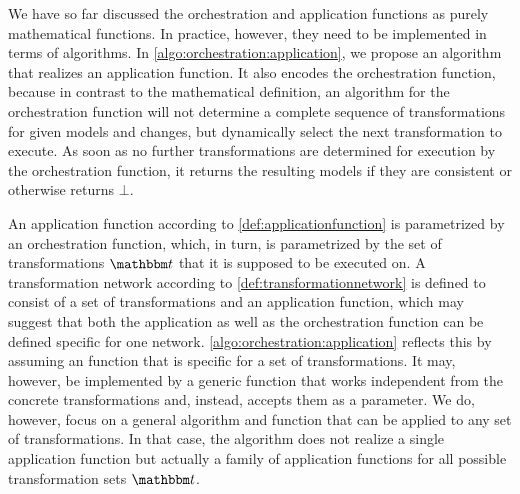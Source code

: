 We have so far discussed the orchestration and application functions as purely mathematical functions.
In practice, however, they need to be implemented in terms of algorithms.
In \autoref{algo:orchestration:application}, we propose an algorithm that realizes an application function.
It also encodes the orchestration function, because in contrast to the mathematical definition, an algorithm for the orchestration function will not determine a complete sequence of transformations for given models and changes, but dynamically select the next transformation to execute.
As soon as no further transformations are determined for execution by the orchestration function, it returns the resulting models if they are consistent or otherwise returns $\bot$.

An application function according to \autoref{def:applicationfunction} is parametrized by an orchestration function, which, in turn, is parametrized by the set of transformations $\transformationset{T}$ that it is supposed to be executed on.
A transformation network according to \autoref{def:transformationnetwork} is defined to consist of a set of transformations and an application function, which may suggest that both the application as well as the orchestration function can be defined specific for one network.
\autoref{algo:orchestration:application} reflects this by assuming an  function that is specific for a set of transformations.
It may, however, be implemented by a generic function that works independent from the concrete transformations and, instead, accepts them as a parameter.
We do, however, focus on a general algorithm and  function that can be applied to any set of transformations.
In that case, the algorithm does not realize a single application function but actually a family of application functions for all possible transformation sets $\transformationset{T}$.

